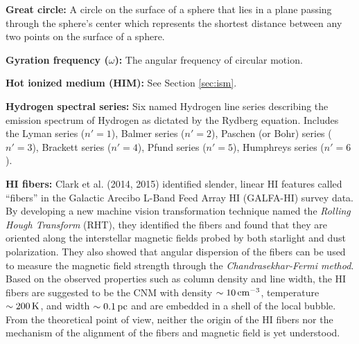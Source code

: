 \documentclass[a4paper,10pt]{article}
\begin{document}
{\noindent}\textbf{Great circle:} A circle on the surface of a sphere that lies in a plane passing through the sphere's center which represents the shortest distance between any two points on the surface of a sphere.

{\noindent}\textbf{Gyration frequency ($\omega$):} The angular frequency of circular motion.

{\noindent}\textbf{Hot ionized medium (HIM):} See Section \ref{sec:ism}. 

{\noindent}\textbf{Hydrogen spectral series:} Six named Hydrogen line series describing the emission spectrum of Hydrogen as dictated by the Rydberg equation. Includes the Lyman series ($n'=1$), Balmer series ($n'=2$), Paschen (or Bohr) series ($n'=3$), Brackett series ($n'=4$), Pfund series ($n'=5$), Humphreys series ($n'=6$).

{\noindent}\textbf{HI fibers:} Clark et al. (2014, 2015) identified slender, linear HI features called ``fibers'' in the Galactic Arecibo L-Band Feed Array HI (GALFA-HI) survey data. By developing a new machine vision transformation technique named the \textit{Rolling Hough Transform} (RHT), they identified the fibers and found that they are oriented along the interstellar magnetic fields probed by both starlight  and dust polarization. They also showed that angular dispersion of the fibers can be used to measure the magnetic field strength through the \textit{Chandrasekhar-Fermi method}. Based on the observed properties such as column density and line width, the HI fibers are suggested to be the CNM with density $\sim10\,{\rm cm^{-3}}$, temperature $\sim200\,{\rm K}$, and width $\sim0.1\,{\rm pc}$ and are embedded in a shell of the local bubble. From the theoretical point of view, neither the origin of the HI fibers nor the mechanism of the alignment of the fibers and magnetic field is yet understood.
\end{document}
